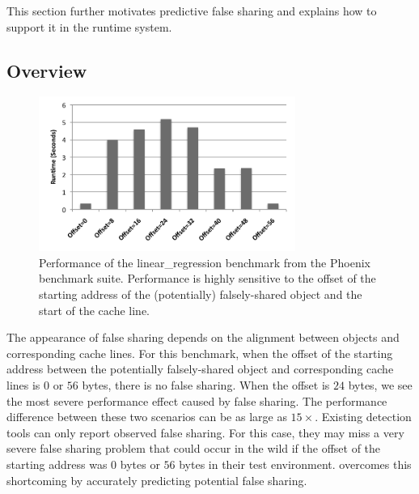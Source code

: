 \label{sec:prediction}
This section further motivates predictive false sharing and explains how to support it in the runtime system.  

\subsection{Overview}
\label{sec:predictoverview}

\begin{figure}[!t]
\begin{center}
\includegraphics[width=3.3in]{fig/perfsensitive}
\end{center}
\caption{
Performance of the linear\_regression benchmark from the Phoenix benchmark suite.
Performance is highly sensitive to the offset of the starting address of the (potentially) falsely-shared object 
and the start of the cache line. 
\label{fig:perfsensitive}}
\end{figure}

The appearance of false sharing depends on 
the alignment between objects and corresponding cache lines.
For this benchmark,
when the offset of the starting address between the potentially falsely-shared object and corresponding cache lines 
is $0$ or $56$ bytes, 
there is no false sharing. 
When the offset is $24$ bytes, we see the most severe performance effect caused 
by false sharing. 
The performance difference between these two scenarios can be as large as $15\times$. 
Existing detection tools can only report observed false sharing.
For this case, they may miss a very severe false sharing problem that could occur in the wild if the offset of the starting 
address was $0$ bytes or $56$ bytes in their test environment.
\Predator{} overcomes this shortcoming by accurately predicting potential false sharing.

